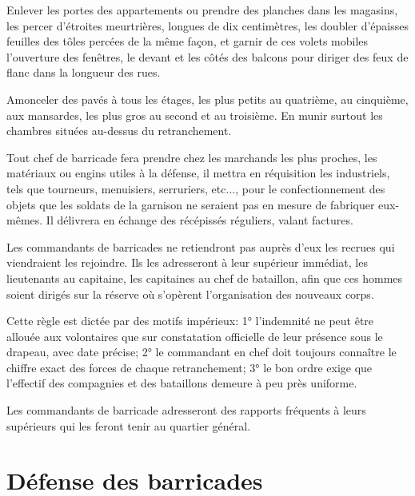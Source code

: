 \documentclass[french,twoside]{book} %
\begin{document}
Enlever les portes des appartements ou prendre des planches dans les magasins, les percer d’étroites meurtrières, longues de dix centimètres, les doubler d’épaisses feuilles des tôles percées de la même façon, et garnir de ces volets mobiles l’ouverture des fenêtres, le devant et les côtés des balcons pour diriger des feux de flanc dans la longueur des rues.\par
Amonceler des pavés à tous les étages, les plus petits au quatrième, au cinquième, aux mansardes, les plus gros au second et au troisième. En munir surtout les chambres situées au-dessus du retranchement.\par
Tout chef de barricade fera prendre chez les marchands les plus proches, les matériaux ou engins utiles à la défense, il mettra en réquisition les industriels, tels que tourneurs, menuisiers, serruriers, etc..., pour le confectionnement des objets que les soldats de la garnison ne seraient pas en mesure de fabriquer eux-mêmes. Il délivrera en échange des récépissés réguliers, valant factures.\par
Les commandants de barricades ne retiendront pas auprès d’eux les recrues qui viendraient les rejoindre. Ils les adresseront à leur supérieur immédiat, les lieutenants au capitaine, les capitaines au chef de bataillon, afin que ces hommes soient dirigés sur la réserve où s’opèrent l’organisation des nouveaux corps.\par
Cette règle est dictée par des motifs impérieux: 1° l’indemnité ne peut être allouée aux volontaires que sur constatation officielle de leur présence sous le drapeau, avec date précise; 2° le commandant en chef doit toujours connaître le chiffre exact des forces de chaque retranchement; 3° le bon ordre exige que l’effectif des compagnies et des bataillons demeure à peu près uniforme.\par
Les commandants de barricade adresseront des rapports fréquents à leurs supérieurs qui les feront tenir au quartier général.
\section[{Défense des barricades}]{Défense des barricades}\renewcommand{\leftmark}{Défense des barricades}
\end{document}
